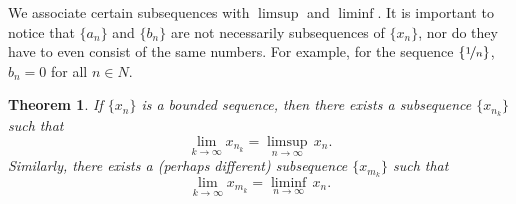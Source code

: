 \documentclass[12pt]{book}
\theoremstyle{plain}
\newtheorem{thm}{Theorem}[section]
\theoremstyle{remark}
\theoremstyle{definition}
\theoremstyle{exercise}
\theoremstyle{example}
\begin{document}
We associate certain subsequences with $\limsup$ and $\liminf$.
It is important to notice that $\{ a_n \}$ and $\{ b_n \}$ are not
necessarily subsequences of $\{ x_n \}$, nor do they have to even 
consist of the same numbers.
For example, for the sequence $\{ \nicefrac{1}{n} \}$,
$b_n = 0$ for all $n \in N$.

\begin{thm} \label{subseqlimsupinf:thm}
If $\{ x_n \}$ is a bounded sequence, then there exists a subsequence
$\{ x_{n_k} \}$ such that
\begin{equation*}
\lim_{k\to \infty} x_{n_k} = \limsup_{n \to \infty} \, x_n .
\end{equation*}
Similarly, there exists a (perhaps different) subsequence
$\{ x_{m_k} \}$ such that
\begin{equation*}
\lim_{k\to \infty} x_{m_k} = \liminf_{n \to \infty} \, x_n .
\end{equation*}
\end{thm}
\end{document}

